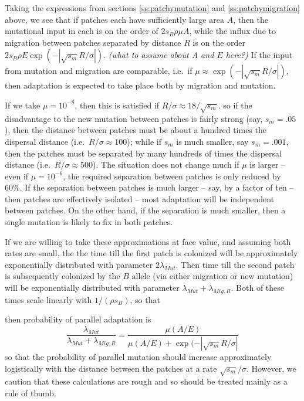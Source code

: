 \documentclass{article}
\newcommand{\gc}[1]{{\it\color{green}(#1)} }
\begin{document}
Taking the expressions from sections \ref{ss:patchymutation} and \ref{ss:patchymigration} above,
we see that if patches each have sufficiently large area $A$,
then the mutational input in each is on the order of $2 s_B \rho \mu A$,
while the influx due to migration between patches separated by
distance $R$ is on the order $2 s_B \rho E \exp(- |\sqrt{s_m}
R/\sigma|)$. \gc{what to assume about A and $E$ here?}
If the input from mutation and migration are comparable, i.e.\ if $\mu \approx \exp( -|\sqrt{s_m} R/\sigma| )$,
then adaptation is expected to take place both by migration and
mutation.

If we take $\mu = 10^{-8}$, then this is satisfied if $R/\sigma \approx 18/\sqrt{s_m}$.
so if the disadvantage to the new mutation between patches is fairly strong (say, $s_m=.05$),
then the distance between patches must be about a hundred times the dispersal distance (i.e.\ $R/\sigma \approx 100$);
while if $s_m$ is much smaller, say $s_m = .001$, 
then the patches must be separated by many hundreds of times the dispersal distance (i.e.\ $R/\sigma \approx 500$).
The situation does not change much if $\mu$ is larger -- even if $\mu = 10^{-6}$, 
the required separation between patches is only reduced by 60\%.
If the separation between patches is much larger -- say, by a factor of ten -- 
then patches are effectively isolated -- most adaptation will be independent between patches.
On the other hand, if the separation is much smaller, then a single
mutation is likely to fix in both patches.

If we are willing to take these approximations at face
value, and assuming both rates are small, the the time till the first
patch is colonized will be approximately exponentially
distributed with parameter $2 \lambda_{Mut}$. Then time till the
second patch is subsequently colonized by the $B$
allele (via either migration or new mutation) will be exponentially
distributed with parameter $\lambda_{Mut}+\lambda_{Mig,R}$. Both of
these times scale linearly with $1/(\rho s_{B})$, so that 

then probability of parallel
adaptation is 
\begin{equation}
\frac{\lambda_{Mut}}{\lambda_{Mut} + \lambda_{Mig,R}} = \frac{\mu (A/E)}{\mu (A/E) + \exp(- |\sqrt{s_m} R/\sigma|}
\end{equation}
so that the probability of parallel mutation should increase
approximately logistically with the distance between the patches at a
rate $\sqrt{s_m} /\sigma$. However, we caution that these calculations
are rough and so should be treated mainly as a rule of thumb. 
\end{document}

